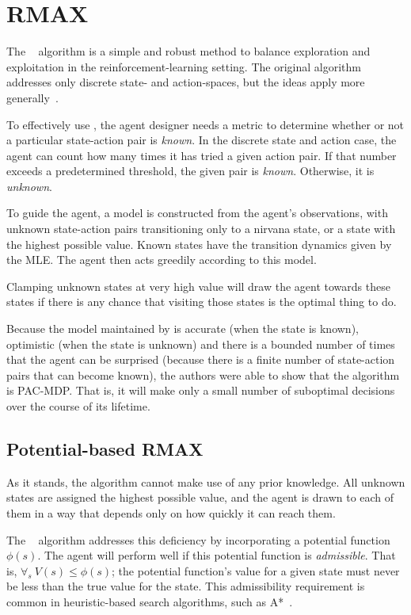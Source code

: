 \section{RMAX}

The ~\cite{brafman03} algorithm is a simple and robust method to balance exploration and exploitation in the reinforcement-learning setting. The original algorithm addresses only discrete state- and action-spaces, but the ideas apply more generally~\cite{nouri09,jong07}.

To effectively use , the agent designer needs a metric to determine whether or not a particular state-action pair is \emph{known}. In the discrete state and action case, the agent can count how many times it has tried a given action pair. If that number exceeds a predetermined threshold, the given pair is \emph{known}. Otherwise, it is \emph{unknown}.

To guide the  agent, a model is constructed from the agent's observations, with unknown state-action pairs transitioning only to a nirvana state, or a state with the highest possible value. Known states have the transition dynamics given by the MLE. The agent then acts greedily according to this model.

Clamping unknown states at very high value will draw the agent towards these states if there is any chance that visiting those states is the optimal thing to do.

Because the model maintained by  is accurate (when the state is known), optimistic (when the state is unknown) and there is a bounded number of times that the agent can be surprised (because there is a finite number of state-action pairs that can become known), the authors were able to show that the algorithm is PAC-MDP. That is, it will make only a small number of suboptimal decisions over the course of its lifetime.

\subsection{Potential-based RMAX}


As it stands, the  algorithm cannot make use of any prior knowledge. All unknown states are assigned the highest possible value, and the agent is drawn to each of them in a way that depends only on how quickly it can reach them.

The ~\cite{asmuth08} algorithm addresses this deficiency by incorporating a potential function $\phi(s)$. The agent will perform well if this potential function is \emph{admissible}. That is, $\forall_s ~ V(s) \leq \phi(s)$; the potential function's value for a given state must never be less than the true value for the state. This admissibility requirement is common in heuristic-based search algorithms, such as A*~\cite{russell1995artificial}.

